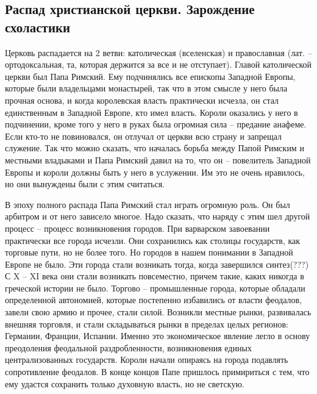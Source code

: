 \subsection{Распад христианской церкви. Зарождение схоластики}

Церковь распадается на 2 ветви: католическая (вселенская) и православная (лат. – ортодоксальная, та, которая держится за все и не отступает). Главой католической церкви был Папа Римский. Ему подчинялись все епископы Западной Европы, которые были владельцами монастырей, так что в этом смысле у него была прочная основа, и когда королевская власть практически исчезла, он стал единственным в Западной Европе, кто имел власть. Короли оказались у него в подчинении, кроме того у него в руках была огромная сила – предание анафеме. Если кто-то не повиновался, он отлучал от церкви всю страну и запрещал служение. Так что можно сказать, что началась борьба между Папой Римским и местными владыками и Папа Римский давил на то, что он – повелитель Западной Европы и короли должны быть у него в услужении. Им это не очень нравилось, но они вынуждены были с этим считаться.

В эпоху полного распада Папа Римский стал играть огромную роль. Он был арбитром и от него зависело многое. Надо сказать, что наряду с этим шел другой процесс – процесс возникновения городов. При варварском завоевании практически все города исчезли. Они сохранились как столицы государств, как торговые пути, но не более того. Но городов в нашем понимании в Западной Европе не было. Эти города стали возникать тогда, когда завершился синтез(???) С X – XI века они стали возникать повсеместно, причем такие, каких никогда в греческой истории не было. Торгово – промышленные города, которые обладали определенной автономией, которые постепенно избавились от власти феодалов, завели свою армию и прочее, стали силой. Возникли местные рынки, развивалась внешняя торговля, и стали складываться рынки в пределах целых регионов: Германии, Франции, Испании. Именно это экономическое явление легло в основу преодоления феодальной раздробленности, возникновения единых централизованных государств. Короли начали опираясь на города подавлять сопротивление феодалов. В конце концов Папе пришлось примириться с тем, что ему удастся сохранить только духовную власть, но не светскую.


